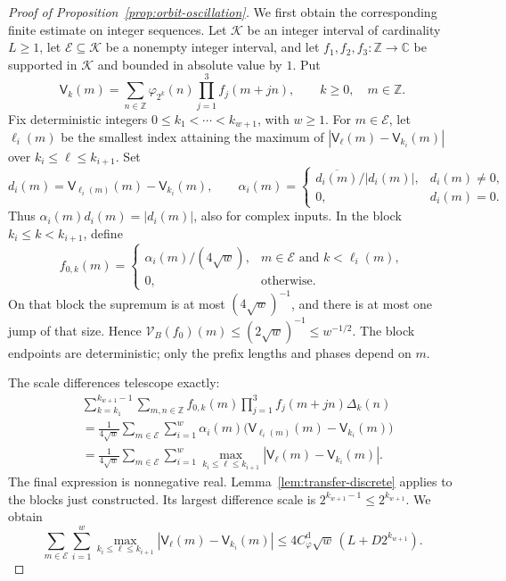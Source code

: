 \begin{proof}[Proof of Proposition~\ref{prop:orbit-oscillation}]
We first obtain the corresponding finite estimate on integer sequences.
Let \(\mathcal K\) be an integer interval of cardinality \(L\geq1\),
let \(\mathcal E\subseteq\mathcal K\) be a nonempty integer interval, and
let \(f_1,f_2,f_3:\mathbb Z\to\mathbb C\) be supported in \(\mathcal K\)
and bounded in absolute value by \(1\).  Put
\[
 \mathsf V_k(m)=\sum_{n\in\mathbb Z}\varphi_{2^k}(n)
                    \prod_{j=1}^3f_j(m+jn),
       \qquad k\geq0,\quad m\in\mathbb Z.
\]
Fix deterministic integers \(0\leq k_1<\cdots<k_{w+1}\), with \(w\geq1\).
For \(m\in\mathcal E\), let \(\ell_i(m)\) be the smallest index attaining
the maximum of \(|\mathsf V_\ell(m)-\mathsf V_{k_i}(m)|\) over
\(k_i\leq\ell\leq k_{i+1}\).  Set
\[
 d_i(m)=\mathsf V_{\ell_i(m)}(m)-\mathsf V_{k_i}(m),\qquad
 \alpha_i(m)=
 \begin{cases}\overline{d_i(m)}/|d_i(m)|,&d_i(m)\neq0,\\
 0,&d_i(m)=0.\end{cases}
\]
Thus \(\alpha_i(m)d_i(m)=|d_i(m)|\), also for complex inputs.  In the
block \(k_i\leq k<k_{i+1}\), define
\[
 f_{0,k}(m)=
 \begin{cases}
  \alpha_i(m)/(4\sqrt w),&m\in\mathcal E\text{ and }k<\ell_i(m),\\
  0,&\text{otherwise}.
 \end{cases}
\]
On that block the supremum is at most \((4\sqrt w)^{-1}\), and there
is at most one jump of that size.  Hence
\(\mathcal V_B(f_0)(m)\leq(2\sqrt w)^{-1}\leq w^{-1/2}\).
The block endpoints are deterministic; only the prefix lengths and
phases depend on \(m\).

The scale differences telescope exactly:
\begin{align*}
 &\sum_{k=k_1}^{k_{w+1}-1}\sum_{m,n\in\mathbb Z}
       f_{0,k}(m)\prod_{j=1}^3f_j(m+jn)\Delta_k(n)\\
 &=\frac1{4\sqrt w}\sum_{m\in\mathcal E}\sum_{i=1}^w
       \alpha_i(m)\bigl(\mathsf V_{\ell_i(m)}(m)
                              -\mathsf V_{k_i}(m)\bigr)\\
 &=\frac1{4\sqrt w}\sum_{m\in\mathcal E}\sum_{i=1}^w
       \max_{k_i\leq\ell\leq k_{i+1}}
            |\mathsf V_\ell(m)-\mathsf V_{k_i}(m)|.
\end{align*}
The final expression is nonnegative real.  Lemma~\ref{lem:transfer-discrete}
applies to the blocks just constructed.  Its largest difference scale
is \(2^{k_{w+1}-1}\leq2^{k_{w+1}}\).  We obtain
\begin{equation}
 \sum_{m\in\mathcal E}\sum_{i=1}^w
       \max_{k_i\leq\ell\leq k_{i+1}}
            |\mathsf V_\ell(m)-\mathsf V_{k_i}(m)|
 \leq 4C_\varphi^{\mathrm d}\sqrt w\,
                  (L+D2^{k_{w+1}}).
 \label{eq:transfer-sequence-oscillation}
\end{equation}


\end{proof}
